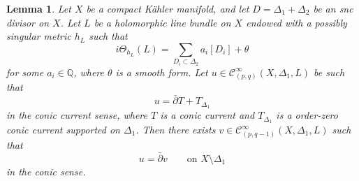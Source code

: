 \documentclass[english]{amsart}
\newcommand{\cC}{\mathcal{C}}
\newcommand{\dbar}{\bar \partial}
\newtheorem{lemme}[thm]{Lemma}
\numberwithin{equation}{thm}
\begin{document}
			\begin{lemme}\label{reglemma1}
				Let $X$ be a compact K\"ahler manifold, and let $D=\Delta_1+\Delta_2$ be an snc divisor on $X$.
				Let $L$ be a holomorphic line bundle on $X$ endowed with a possibly singular metric $h_L$ such that
				\[
				i\Theta_{h_L}(L)=\sum_{D_i\subset \Delta_2} a_i [D_i]+\theta
				\]
				for some $a_i\in \mathbb Q$, where $\theta$ is a smooth form.
				Let $u\in \cC^\infty_{(p,q)}(X,\Delta_1,L)$ be such that
				\begin{equation}\label{eqcurrent}
					u=\dbar T + T_{\Delta_1}
				\end{equation}
				in the conic current sense, where $T$ is a conic current and $T_{\Delta_1}$ is a order-zero conic current supported on $\Delta_1$.
				Then there exists $v\in \cC^\infty_{(p,q-1)}(X,\Delta_1,L)$ such that
				\[
				u=\dbar v \qquad \text{on } X\setminus \Delta_1
				\]
				in the conic sense.
			\end{lemme}
			
\end{document}
